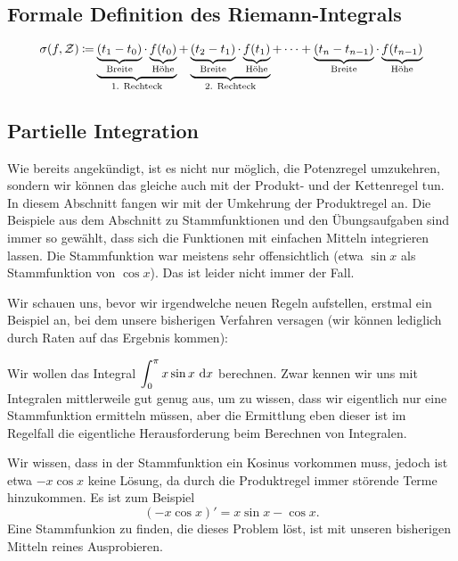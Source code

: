 \documentclass[../../main.tex]{subfiles}
\begin{document}
\subsection*{Formale Definition des Riemann-Integrals}
\label{riemannintegral-richtig}
\[\sigma(f,\mathcal{Z})\mathbin{\coloneqq}\underbrace{\underbrace{(t_1-t_0)}_{\text{Breite}}\cdot \underbrace{f(t_0)}_{\text{Höhe}}}_{\text{1. Rechteck}}+\underbrace{\underbrace{(t_2-t_1)}_{\text{Breite}}\cdot \underbrace{f(t_1)}_{\text{Höhe}}}_{\text{2. Rechteck}}+\dots+\underbrace{(t_n-t_{n-1})}_{\text{Breite}}\cdot \underbrace{f(t_{n-1})}_{\text{Höhe}}\]    

\subsection*{Partielle Integration}
\label{partielle-integration}
Wie bereits angekündigt, ist es nicht nur möglich, die Potenzregel umzukehren, sondern wir können das gleiche auch
mit der Produkt- und der Kettenregel tun. In diesem Abschnitt fangen wir mit der Umkehrung der Produktregel an. Die
Beispiele aus dem Abschnitt zu Stammfunktionen und den Übungsaufgaben sind immer so gewählt, dass sich die Funktionen
mit einfachen Mitteln integrieren lassen. Die Stammfunktion war meistens sehr offensichtlich (etwa $\sin x$ als Stammfunktion 
von $\cos x$). Das ist leider nicht immer der Fall.

Wir schauen uns, bevor wir irgendwelche neuen Regeln aufstellen, erstmal ein Beispiel an, bei dem unsere bisherigen Verfahren 
versagen (wir können lediglich durch Raten auf das Ergebnis kommen):
\begin{example}{}
    Wir wollen das Integral $\displaystyle\int_0^\pi x\sin x\mathop{}\mathrm{d} x$ berechnen. Zwar kennen wir uns mit Integralen 
    mittlerweile gut genug aus, um zu wissen, dass wir eigentlich nur eine Stammfunktion ermitteln müssen, aber die 
    Ermittlung eben dieser ist im Regelfall die eigentliche Herausforderung beim Berechnen von Integralen.

    Wir wissen, dass in der Stammfunktion ein Kosinus vorkommen muss, jedoch ist etwa $-x\cos x$ keine Lösung, da durch
    die Produktregel immer störende Terme hinzukommen. Es ist zum Beispiel
    \[(-x\cos x)'=x\sin x-\cos x.\]
    Eine Stammfunkion zu finden, die dieses Problem löst, ist mit unseren bisherigen Mitteln reines Ausprobieren.
\end{example}
\end{document}
